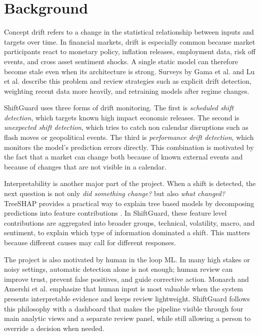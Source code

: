 \documentclass[11pt]{article}
\begin{document}
\section{Background}
Concept drift refers to a change in the statistical relationship between inputs and targets over time. In financial markets, drift is especially common because market participants react to monetary policy, inflation releases, employment data, risk off events, and cross asset sentiment shocks. A single static model can therefore become stale even when its architecture is strong. Surveys by Gama et al. \cite{gama2014survey} and Lu et al. \cite{lu2019review} describe this problem and review strategies such as explicit drift detection, weighting recent data more heavily, and retraining models after regime changes.

ShiftGuard uses three forms of drift monitoring. The first is \textit{scheduled shift detection}, which targets known high impact economic releases. The second is \textit{unexpected shift detection}, which tries to catch non calendar disruptions such as flash moves or geopolitical events. The third is \textit{performance drift detection}, which monitors the model's prediction errors directly. This combination is motivated by the fact that a market can change both because of known external events and because of changes that are not visible in a calendar.

Interpretability is another major part of the project. When a shift is detected, the next question is not only \textit{did something change?} but also \textit{what changed?} TreeSHAP provides a practical way to explain tree based models by decomposing predictions into feature contributions \cite{lundberg2017shap}. In ShiftGuard, these feature level contributions are aggregated into broader groups, technical, volatility, macro, and sentiment, to explain which type of information dominated a shift. This matters because different causes may call for different responses.

The project is also motivated by human in the loop ML. In many high stakes or noisy settings, automatic detection alone is not enough; human review can improve trust, prevent false positives, and guide corrective action. Monarch \cite{monarch2021hitl} and Amershi et al. \cite{amershi2014power} emphasize that human input is most valuable when the system presents interpretable evidence and keeps review lightweight. ShiftGuard follows this philosophy with a dashboard that makes the pipeline visible through four main analytic views and a separate review panel, while still allowing a person to override a decision when needed.
\end{document}
